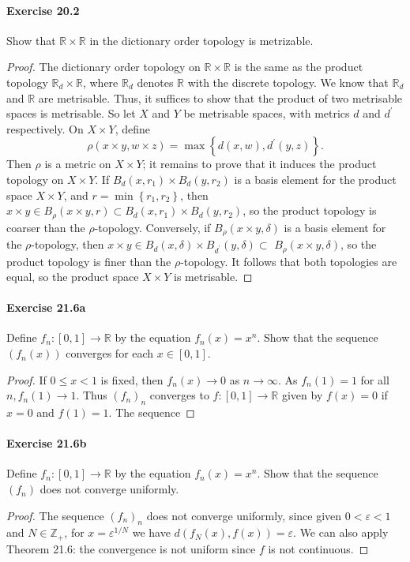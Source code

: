 \documentclass{article}
\begin{document}
\paragraph{Exercise 20.2} Show that $\mathbb{R} \times \mathbb{R}$ in the dictionary order topology is metrizable.
\begin{proof}
    The dictionary order topology on $\mathbb{R} \times \mathbb{R}$ is the same as the product topology $\mathbb{R}_d \times \mathbb{R}$, where $\mathbb{R}_d$ denotes $\mathbb{R}$ with the discrete topology. We know that $\mathbb{R}_d$ and $\mathbb{R}$ are metrisable. Thus, it suffices to show that the product of two metrisable spaces is metrisable.
So let $X$ and $Y$ be metrisable spaces, with metrics $d$ and $d^{\prime}$ respectively. On $X \times Y$, define
$$
\rho(x \times y, w \times z)=\max \left\{d(x, w), d^{\prime}(y, z)\right\} .
$$
Then $\rho$ is a metric on $X \times Y$; it remains to prove that it induces the product topology on $X \times Y$. If $B_d\left(x, r_1\right) \times B_d\left(y, r_2\right)$ is a basis element for the product space $X \times Y$, and $r=\min \left\{r_1, r_2\right\}$, then $x \times y \in B_\rho(x \times y, r) \subset B_d\left(x, r_1\right) \times B_d\left(y, r_2\right)$, so the product topology is coarser than the $\rho$-topology. Conversely, if $B_\rho(x \times y, \delta)$ is a basis element for the $\rho$-topology, then $x \times y \in B_d(x, \delta) \times B_{d^{\prime}}(y, \delta) \subset$ $B_\rho(x \times y, \delta)$, so the product topology is finer than the $\rho$-topology. It follows that both topologies are equal, so the product space $X \times Y$ is metrisable.
\end{proof}



\paragraph{Exercise 21.6a} Define $f_{n}:[0,1] \rightarrow \mathbb{R}$ by the equation $f_{n}(x)=x^{n}$. Show that the sequence $\left(f_{n}(x)\right)$ converges for each $x \in[0,1]$.
\begin{proof}
If $0 \leq x<1$ is fixed, then $f_n(x) \rightarrow 0$ as $n \rightarrow \infty$. As $f_n(1)=1$ for all $n, f_n(1) \rightarrow 1$. Thus $\left(f_n\right)_n$ converges to $f:[0,1] \rightarrow \mathbb{R}$ given by $f(x)=0$ if $x=0$ and $f(1)=1$. The sequence
\end{proof}

\paragraph{Exercise 21.6b} Define $f_{n}:[0,1] \rightarrow \mathbb{R}$ by the equation $f_{n}(x)=x^{n}$. Show that the sequence $\left(f_{n}\right)$ does not converge uniformly.
\begin{proof}
    The sequence $\left(f_n\right)_n$ does not converge uniformly, since given $0<\varepsilon<1$ and $N \in \mathbb{Z}_{+}$, for $x=\varepsilon^{1 / N}$ we have $d\left(f_N(x), f(x)\right)=\varepsilon$. We can also apply Theorem 21.6: the convergence is not uniform since $f$ is not continuous.
\end{proof}
\end{document}

